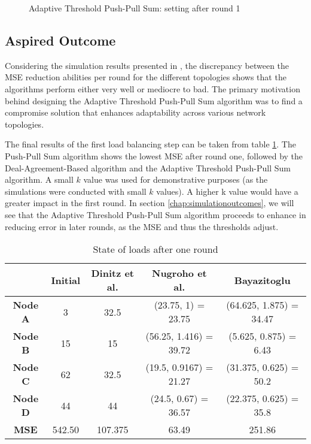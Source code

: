 \begin{figure}
    \centering
    \scalebox{0.75}{}
    \caption{Adaptive Threshold Push-Pull Sum: setting after round 1}
    \label{fig:ATPPSExampleResult}
\end{figure}
\subsection{Aspired Outcome}\label{subsec:aspiredOutcomeAdaptiveThresholdPPS}

Considering the simulation results presented in \cite{Bayazitoglu}, the discrepancy between the MSE reduction abilities per round for the different topologies shows that the algorithms perform either very well or mediocre to bad. The primary motivation behind designing the Adaptive Threshold Push-Pull Sum algorithm was to find a compromise solution that enhances adaptability across various network topologies.

The final results of the first load balancing step can be taken from table \ref{tab:overviewExamples}. The Push-Pull Sum algorithm shows the lowest MSE after round one, followed by the Deal-Agreement-Based algorithm and the Adaptive Threshold Push-Pull Sum algorithm. A small $k$ value was used for demonstrative purposes (as the simulations were conducted with small $k$ values). A higher k value would have a greater impact in the first round. In section \ref{chap:simulationoutcomes}, we will see that the Adaptive Threshold Push-Pull Sum algorithm proceeds to enhance in reducing error in later rounds, as the MSE and thus the thresholds adjust.

\begin{table}
\centering
\begin{tabular}{|c|c|c|c|c|}
\hline
 & \textbf{Initial} & \textbf{Dinitz et al.} & \textbf{Nugroho et al.} & \textbf{Bayazitoglu} \\ \hline
\textbf{Node A}  & 3      & 32.5    & (23.75, 1) = 23.75     & (64.625, 1.875) = 34.47 \\ \hline
\textbf{Node B}  & 15     & 15      & (56.25, 1.416) = 39.72 & (5.625, 0.875) = 6.43   \\ \hline
\textbf{Node C}  & 62     & 32.5    & (19.5, 0.9167) = 21.27 & (31.375, 0.625) = 50.2  \\ \hline
\textbf{Node D}  & 44     & 44      & (24.5, 0.67) = 36.57   & (22.375, 0.625) = 35.8  \\ \hline
\textbf{MSE} & 542.50 & 107.375 & 63.49                  & 251.86                  \\ \hline
\end{tabular}
\caption{State of loads after one round}
\label{tab:overviewExamples}
\end{table}